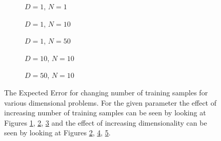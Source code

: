 \begin{figure}[!h]
  \centering
    \begin{subfigure}{0.33\textwidth}
      \centering
      \caption{$D=1$, $N=1$}
      \label{fig:linear-c-N-1-D-1}
    \end{subfigure}
    \begin{subfigure}{0.33\textwidth}
      \centering
      \caption{$D=1$, $N=10$}
      \label{fig:linear-c-N-10-D-1}
    \end{subfigure}
    \begin{subfigure}{0.33\textwidth}
      \centering
      \caption{$D=1$, $N=50$}
      \label{fig:linear-c-N-50-D-1}
    \end{subfigure}

    \begin{subfigure}{0.33\textwidth}
      \centering
      \caption{$D=10$, $N=10$}
      \label{fig:linear-c-N-10-D-10}
    \end{subfigure}
    \begin{subfigure}{0.33\textwidth}
      \centering
      \caption{$D=50$, $N=10$}
      \label{fig:linear-c-N-10-D-50}
    \end{subfigure}  

  \caption{The Expected Error for changing number of training samples for various dimensional problems. For the given parameter the effect of increasing number of training samples can be seen by looking at Figures \ref{fig:linear-c-N-1-D-1}, \ref{fig:linear-c-N-10-D-1}, \ref{fig:linear-c-N-50-D-1} and the effect of increasing dimensionality can be seen by looking at Figures \ref{fig:linear-c-N-10-D-1}, \ref{fig:linear-c-N-10-D-10}, \ref{fig:linear-c-N-10-D-50}.}\label{fig:linear-c}
\end{figure}

